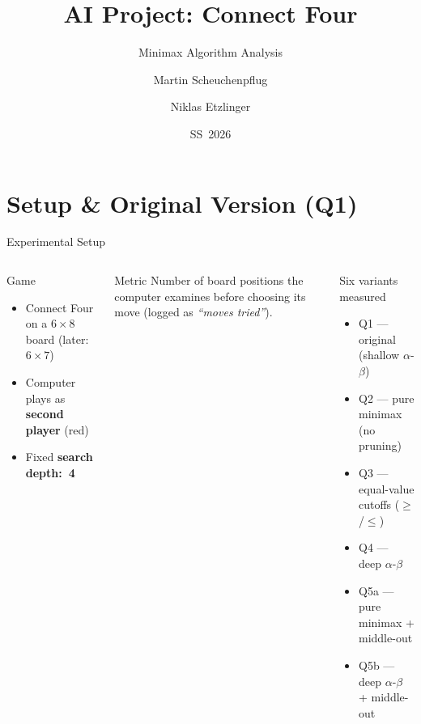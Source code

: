 \documentclass[aspectratio=1610]{beamer}
\title{AI Project: Connect Four}
\subtitle{Minimax Algorithm Analysis}
\date{SS~2026}
\author{Martin Scheuchenpflug \and Niklas Etzlinger}
\institute{Artificial Intelligence --- FH Upper Austria}
\begin{document}

\begin{frame}
  \titlepage
\end{frame}



\section{Setup \& Original Version (Q1)}

\begin{frame}{Experimental Setup}
  \begin{columns}[T]
      \begin{block}{Game}
        \begin{itemize}
          \item Connect Four on a $6 \times 8$ board (later: $6 \times 7$)
          \item Computer plays as \textbf{second player} (red)
          \item Fixed \textbf{search depth:~4}
        \end{itemize}
      \end{block}
      \begin{block}{Metric}
        Number of board positions the computer examines before choosing its move
        (logged as \emph{``moves tried''}).
      \end{block}
      \begin{alertblock}{Six variants measured}
        \begin{itemize}
          \item Q1 — original (shallow $\alpha$-$\beta$)
          \item Q2 — pure minimax (no pruning)
          \item Q3 — equal-value cutoffs ($\geq$/$\leq$)
          \item Q4 — deep $\alpha$-$\beta$
          \item Q5a — pure minimax + middle-out
          \item Q5b — deep $\alpha$-$\beta$ + middle-out
        \end{itemize}
      \end{alertblock}
  \end{columns}
\end{frame}
\end{document}
